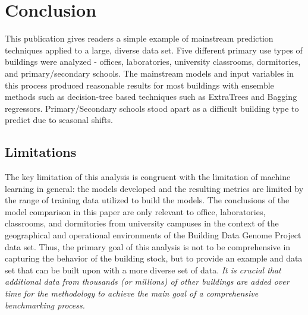 \documentclass[preprint,12pt]{elsarticle}
\begin{document}



\section{Conclusion}
\label{sec:conclusion}
This publication gives readers a simple example of mainstream prediction techniques applied to a large, diverse data set. Five different primary use types of buildings were analyzed - offices, laboratories, university classrooms, dormitories, and primary/secondary schools. The mainstream models and input variables in this process produced reasonable results for most buildings with ensemble methods such as decision-tree based techniques such as ExtraTrees and Bagging regressors. Primary/Secondary schools stood apart as a difficult building type to predict due to seasonal shifts. 


\subsection{Limitations}
\label{sec:limitations}
The key limitation of this analysis is congruent with the limitation of machine learning in general: the models developed and the resulting metrics are limited by the range of training data utilized to build the models. The conclusions of the model comparison in this paper are only relevant to office, laboratories, classrooms, and dormitories from university campuses in the context of the geographical and operational environments of the Building Data Genome Project data set. Thus, the primary goal of this analysis is not to be comprehensive in capturing the behavior of the building stock, but to provide an example and data set that can be built upon with a more diverse set of data. \emph{It is crucial that additional data from thousands (or millions) of other buildings are added over time for the methodology to achieve the main goal of a comprehensive benchmarking process.}
\end{document}
